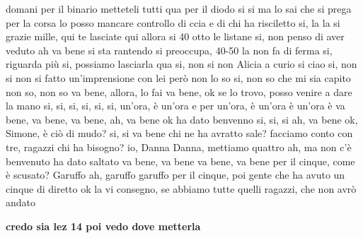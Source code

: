 domani per il binario metteteli tutti qua per il diodo si si ma lo sai che si prega per la corsa lo posso mancare controllo di ccia e di chi ha risciletto si, la la si grazie mille, qui te lasciate qui allora si 40 otto le listane si, non penso di aver veduto ah va bene si sta rantendo si preoccupa, 40-50 la non fa di ferma si, riguarda più si, possiamo lasciarla qua si, non si non Alicia a curio si ciao si, non si non si fatto un'imprensione con lei però non lo so si, non so che mi sia capito non so, non so va bene, allora, lo fai va bene, ok se lo trovo, posso venire a dare la mano si, si, si, si, si, si, un'ora, è un'ora e per un'ora, è un'ora è un'ora è va bene, va bene, va bene, ah, va bene ok ha dato benvenno si, si, si ah, va bene ok, Simone, è ciò di mudo? si, si va bene chi ne ha avratto sale? facciamo conto con tre, ragazzi chi ha bisogno? io, Danna Danna, mettiamo quattro ah, ma non c'è benvenuto ha dato saltato va bene, va bene va bene, va bene per il cinque, come è scusato? Garuffo ah, garuffo garuffo per il cinque, poi gente che ha avuto un cinque di diretto ok la vi consegno, se abbiamo tutte quelli ragazzi, che non avrò andato

\textbf{credo sia lez 14 poi vedo dove metterla}

